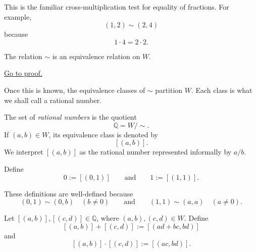 \begin{remark}
This is the familiar cross-multiplication test for equality of fractions.  For example,
\[
(1,2)\sim(2,4)
\]
because
\[
1\cdot 4 = 2\cdot 2.
\]
\end{remark}

\begin{theorem}
\label{thm:fraction-pair-equivalence}
The relation $\sim$ is an equivalence relation on $W$.
\end{theorem}

\begin{remark*}[Proof]
\hyperref[prf:fraction-pair-equivalence]{Go to proof.}
\end{remark*}

\begin{remark}
Once this is known, the equivalence classes of $\sim$ partition $W$.  Each class is what we shall
call a rational number.
\end{remark}

\begin{definition}
\label{def:rational-numbers}

The set of \emph{rational numbers} is the quotient
\[
\mathbb{Q} = W/\sim.
\]
If $(a,b)\in W$, its equivalence class is denoted by
\[
[(a,b)].
\]
We interpret $[(a,b)]$ as the rational number represented informally by $a/b$.

\end{definition}

\begin{definition}
\label{def:rational-distinguished}

Define
\[
0 := [(0,1)]
\qquad\text{and}\qquad
1 := [(1,1)].
\]

\end{definition}

\begin{remark}
These definitions are well-defined because
\[
(0,1)\sim(0,b) \quad (b\neq 0)
\qquad\text{and}\qquad
(1,1)\sim(a,a) \quad (a\neq 0).
\]
\end{remark}

\begin{definition}
\label{def:rational-operations}

Let $[(a,b)],[(c,d)]\in\mathbb{Q}$, where $(a,b),(c,d)\in W$.  Define
\[
[(a,b)] + [(c,d)] := [(ad+bc,bd)]
\]
and
\[
[(a,b)]\cdot[(c,d)] := [(ac,bd)].
\]

\end{definition}

